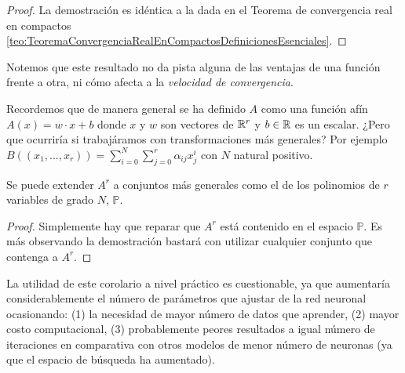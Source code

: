 \setlength{\marginparwidth}{\smallMarginSize}
\reversemarginpar
{}
\normalmarginpar

\begin{proof}
    La demostración es idéntica a la dada en el Teorema de convergencia 
    real en compactos \ref{teo:TeoremaConvergenciaRealEnCompactosDefinicionesEsenciales}.
\end{proof}

Notemos que este resultado no da pista alguna de las ventajas de una función frente a otra,
 ni cómo afecta a la \textit{velocidad de convergencia}. 


Recordemos que de manera general se ha definido $A$ como una función afín 
$A(x) = w \cdot x + b$ donde $x$ y $w$ son vectores de $\mathbb{R}^r$  y $b \in \mathbb{R}$ es un escalar.  ¿Pero que ocurriría si trabajáramos con transformaciones más generales?  
Por ejemplo $B((x_1, ..., x_r)) = \sum_{i= 0} ^N \sum_{j= 0} ^r \alpha_{ij} x_j^i$  con $N$ natural positivo. 

\begin{corolario}[Generalización de A]  \label{corolario:generaliza-a}
    Se puede extender $A^r$ a conjuntos más generales como el de los polinomios de $r$ variables de grado $N$, $\mathbb{P}$.  
\end{corolario}

\setlength{\marginparwidth}{\bigMarginSize}

\begin{proof}
    Simplemente hay que reparar que $A^r$ está contenido en el espacio $\mathbb{P}$. 
    Es más observando la demostración bastará con utilizar cualquier conjunto que contenga a $A^r$. 
\end{proof}

La utilidad de este corolario a nivel práctico es cuestionable, ya que aumentaría considerablemente el número de 
parámetros que ajustar de la red neuronal ocasionando: (1) la necesidad de mayor número de datos que aprender, 
(2) mayor costo computacional, (3) probablemente peores resultados a igual número de iteraciones en comparativa 
con otros modelos de menor número de neuronas (ya que el espacio de búsqueda ha aumentado).

